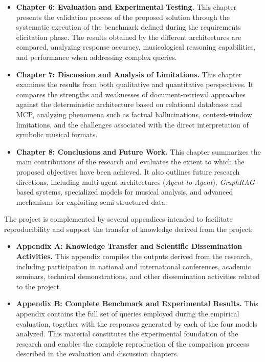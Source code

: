 \begin{itemize}
\item \textbf{Chapter 6: Evaluation and Experimental Testing.} This chapter presents the validation process of the proposed solution through the systematic execution of the benchmark defined during the requirements elicitation phase. The results obtained by the different architectures are compared, analyzing response accuracy, musicological reasoning capabilities, and performance when addressing complex queries.
\item \textbf{Chapter 7: Discussion and Analysis of Limitations.} This chapter examines the results from both qualitative and quantitative perspectives. It compares the strengths and weaknesses of document-retrieval approaches against the deterministic architecture based on relational databases and MCP, analyzing phenomena such as factual hallucinations, context-window limitations, and the challenges associated with the direct interpretation of symbolic musical formats.
\item \textbf{Chapter 8: Conclusions and Future Work.} This chapter summarizes the main contributions of the research and evaluates the extent to which the proposed objectives have been achieved. It also outlines future research directions, including multi-agent architectures (\textit{Agent-to-Agent}), \textit{GraphRAG}-based systems, specialized models for musical analysis, and advanced mechanisms for exploiting semi-structured data.
\end{itemize}

The project is complemented by several appendices intended to facilitate reproducibility and support the transfer of knowledge derived from the project:

\begin{itemize}
\item \textbf{Appendix A: Knowledge Transfer and Scientific Dissemination Activities.} This appendix compiles the outputs derived from the research, including participation in national and international conferences, academic seminars, technical demonstrations, and other dissemination activities related to the project.
\item \textbf{Appendix B: Complete Benchmark and Experimental Results.} This appendix contains the full set of queries employed during the empirical evaluation, together with the responses generated by each of the four models analyzed. This material constitutes the experimental foundation of the research and enables the complete reproduction of the comparison process described in the evaluation and discussion chapters.
\end{itemize}

